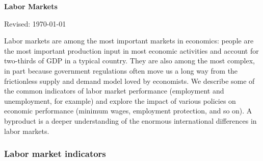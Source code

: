 \documentclass[letterpaper,12pt]{article}
\def\HeadName{Labor Markets}
\begin{document}
\thispagestyle{empty}%
\Head

\centerline{\large \bf \HeadName}%
\centerline{Revised: \today}

\bigskip
Labor markets are among the most important markets in economics:
people are the most important production input in most economic activities
and account for two-thirds of GDP in a typical country. 
They are also among the most complex, 
in part because government regulations often move us a long way
from the frictionless supply and demand model loved by economists.
We describe some of the common indicators of labor market performance
(employment and unemployment, for example)
and explore the impact of various policies on economic performance 
(minimum wages, employment protection, and so on).  
A byproduct is a deeper understanding of the enormous 
international differences in labor markets.  
 
\begin{comment}
**** CLASS PLAN ****
Class 1:
\begin{itemize}
\item Revisit growth:  institutions matter \\ Hamilton-Madison \\
    Tree for lending and creditor protections 
\item Compare France and US --- Rogerson data?? 
\item Unemployment and min wage 
\item Costs of labor market protection?
\end{itemize}

Class 2:  
\begin{itemize}
\item Question:  hiring in US and France 
\item Churning:  Marx-Engels and Schumpeter quotations, volatility figures... 
Stories about labor market changes ...  
\item Question:  hiring in US and France 
\item 
\end{itemize}
\end{comment}


\subsubsection*{Labor market indicators}
\end{document}
